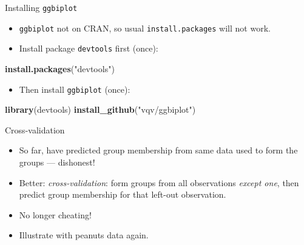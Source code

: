 \documentclass[ignorenonframetext,]{beamer}
\newenvironment{Shaded}{\begin{snugshade}}{\end{snugshade}}
\newcommand{\KeywordTok}[1]{\textcolor[rgb]{0.13,0.29,0.53}{\textbf{#1}}}
\newcommand{\NormalTok}[1]{#1}
\newcommand{\StringTok}[1]{\textcolor[rgb]{0.31,0.60,0.02}{#1}}
\providecommand{\tightlist}{%
  \setlength{\itemsep}{0pt}\setlength{\parskip}{0pt}}
\begin{document}
\begin{frame}[fragile]{Installing \texttt{ggbiplot}}
\protect\hypertarget{installing-ggbiplot}{}

\begin{itemize}
\item
  \texttt{ggbiplot} not on CRAN, so usual \texttt{install.packages} will
  not work.
\item
  Install package \texttt{devtools} first (once):
\end{itemize}

\begin{Shaded}
\begin{Highlighting}[]
\KeywordTok{install.packages}\NormalTok{(}\StringTok{"devtools"}\NormalTok{)}
\end{Highlighting}
\end{Shaded}

\begin{itemize}
\tightlist
\item
  Then install \texttt{ggbiplot} (once):
\end{itemize}

\begin{Shaded}
\begin{Highlighting}[]
\KeywordTok{library}\NormalTok{(devtools)}
\KeywordTok{install_github}\NormalTok{(}\StringTok{"vqv/ggbiplot"}\NormalTok{)}
\end{Highlighting}
\end{Shaded}

\end{frame}

\begin{frame}{Cross-validation}
\protect\hypertarget{cross-validation}{}

\begin{itemize}
\item
  So far, have predicted group membership from same data used to form
  the groups --- dishonest!
\item
  Better: \emph{cross-validation}: form groups from all observations
  \emph{except one}, then predict group membership for that left-out
  observation.
\item
  No longer cheating!
\item
  Illustrate with peanuts data again.
\end{itemize}

\end{frame}
\end{document}
